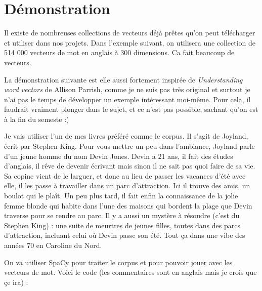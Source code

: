 \documentclass[11pt, a4paper]{report}
\begin{document}
\section{Démonstration}
Il existe de nombreuses collections de vecteurs déjà prêtes qu'on 
peut télécharger et utiliser dans nos projets. Dans l'exemple suivant, 
on utilisera une collection de 514 000 vecteurs de mot en anglais à 300 dimensions. 
Ca fait beaucoup de vecteurs. 

La démonstration suivante est elle aussi fortement inspirée de 
\textit{Understanding word vectors} de Allison Parrish, comme je ne suis pas 
très original et surtout je n'ai pas le temps de développer un exemple intéressant 
moi-même. Pour cela, il faudrait vraiment plonger dans le sujet, et ce n'est pas 
possible, sachant qu'on est à la fin du semeste :)

Je vais utiliser l'un de mes livres préféré comme le corpus. Il s'agit de 
Joyland, écrit par Stephen King. Pour vous mettre un peu dans l'ambiance, 
Joyland parle d'un jeune homme du nom Devin Jones. Devin a 21 ans, il fait 
des études d'anglais, il rêve de devenir écrivant mais sinon il ne sait pas 
quoi faire de sa vie. Sa copine vient de le larguer, et donc au lieu de 
passer les vacances d'été avec elle, il les passe à travailler dans un parc 
d'attraction. Ici il trouve des amis, un boulot qui le plaît. Un peu plus tard, 
il fait enfin la connaissance de la jolie femme blonde qui habite dans l'une des maisons 
qui bordent la plage que Devin traverse pour se rendre au parc. Il y a aussi 
un mystère à résoudre (c'est du Stephen King) : une suite de meurtres de jeunes 
filles, toutes dans des parcs d'attraction, incluant celui où Devin passe son été. 
Tout ça dans une vibe des années 70 en Caroline du Nord. 

On va utiliser SpaCy pour traiter le corpus et pour pouvoir jouer avec les 
vecteurs de mot. Voici le code (les commentaires sont en anglais mais je crois que 
çe ira) : 
\end{document}
